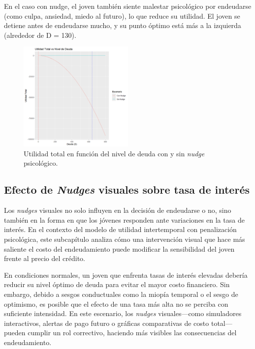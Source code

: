 \documentclass[10pt]{article}
\begin{document}
\begin{multicols}{2}
En el caso con nudge, el joven también siente malestar psicológico por endeudarse (como culpa, ansiedad, miedo al futuro), lo que reduce su utilidad. El joven se detiene antes de endeudarse mucho, y su punto óptimo está más a la izquierda (alrededor de D = 130).

\begin{figure}[H]
    \centering
    \includegraphics[width=0.5\textwidth]{grafica_utilidad_vs_deuda.png} %
    \caption{Utilidad total en función del nivel de deuda con y sin \textit{nudge} psicológico.}
    \label{fig:utilidad-vs-deuda}
\end{figure}
\vspace{1em}
\noindent

\subsection{Efecto de \textit{Nudges} visuales sobre tasa de interés}

Los \textit{nudges} visuales no solo influyen en la decisión de endeudarse o no, sino también en la forma en que los jóvenes responden ante variaciones en la tasa de interés. En el contexto del modelo de utilidad intertemporal con penalización psicológica, este subcapítulo analiza cómo una intervención visual que hace más saliente el costo del endeudamiento puede modificar la sensibilidad del joven frente al precio del crédito.

En condiciones normales, un joven que enfrenta tasas de interés elevadas debería reducir su nivel óptimo de deuda para evitar el mayor costo financiero. Sin embargo, debido a sesgos conductuales como la miopía temporal o el sesgo de optimismo, es posible que el efecto de una tasa más alta no se perciba con suficiente intensidad. En este escenario, los \textit{nudges} visuales—como simuladores interactivos, alertas de pago futuro o gráficas comparativas de costo total—pueden cumplir un rol correctivo, haciendo más visibles las consecuencias del endeudamiento.


\end{multicols}
\end{document}
